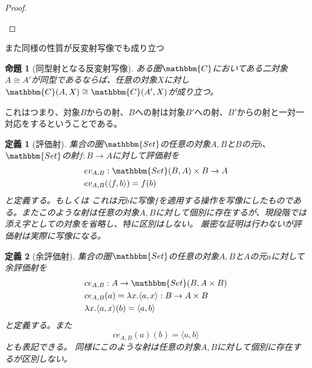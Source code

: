 \documentclass[uplatex,dvipdfmx]{jsarticle}
\newcommand{\cat}[1]{\mathbbm{#1}}
\newcommand{\arrow}{\rightarrow}
\newcommand{\tuple}[1]{\langle #1\rangle}
\newcommand{\mor}[3]{#1:#2\arrow #3}
\newcommand{\arset}[3]{\cat{#1}(#2,#3)}
\newtheorem{proof}{証明}[section]
\newtheorem{prop}{命題}[section]
\newtheorem{define}{定義}[section]
\numberwithin{proof}{subsection}
\numberwithin{prop}{subsection}
\numberwithin{define}{subsection}
\begin{document}
\begin{proof}
\begin{center}
		\end{center}
  \end{proof}
  
  また同様の性質が反変射写像でも成り立つ
  \begin{prop}[同型射となる反変射写像]
    ある圏$\cat{C}$においてある二対象$A\cong A'$が同型であるならば、任意の対象$X$に対し$\arset{C}{A}{X}\cong\arset{C}{A'}{X}$が成り立つ。
  \end{prop}
  
  これはつまり、対象$B$からの射、$B$への射は対象$B'$への射、$B'$からの射と一対一対応をするということである。
  \begin{define}[評価射]
		集合の圏$\cat{Set}$の任意の対象$A,B$と$B$の元$b$、$\cat{Set}$の射$\mor{f}{B}{A}$に対して評価射を
		\begin{align*}
			\mor{&ev_{A,B}}{\arset{Set}{B}{A}\times B}{A}\\
			&ev_{A,B}(\tuple{f,b})=f(b)\\
		\end{align*}
		と定義する。もしくは
    これは元$b$に写像$f$を適用する操作を写像にしたものである。またこのような射は任意の対象$A,B$に対して個別に存在するが、現段階では添え字としての対象を省略し、特に区別はしない。
		厳密な証明は行わないが評価射は実際に写像になる。
	\end{define}

	\begin{define}[余評価射]
		集合の圏$\cat{Set}$の任意の対象$A,B$と$A$の元$a$に対して余評価射を
		\begin{align*}
			\mor{&ce_{A,B}}{A}{\arset{Set}{B}{A\times B}}\\
			&ce_{A,B}(a)=\lambda x.\tuple{a,x}\mor{}{B}{A\times B}\\
			&\lambda x.\tuple{a,x}(b)=\tuple{a,b}
		\end{align*}
		と定義する。また\[ce_{A,B}(a)(b)=\tuple{a,b}\]とも表記できる。
    同様にこのような射は任意の対象$A,B$に対して個別に存在するが区別しない。
	\end{define}
\end{document}
